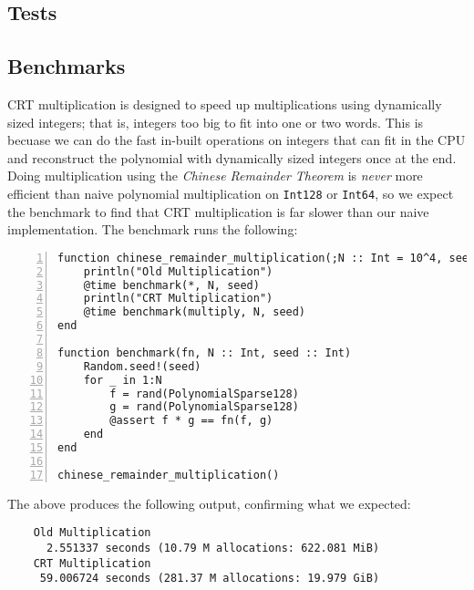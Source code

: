 \documentclass{article}
\theoremstyle{plain}
\numberwithin{theorem}{section}
\numberwithin{example}{section}
\theoremstyle{definition}
\numberwithin{definition}{section}
\begin{document}
\bigbreak

\subsection{Tests}

\bigbreak

\subsection{Benchmarks}
CRT multiplication is designed to speed up multiplications using dynamically
sized integers; that is, integers too big to fit into one or two words. This is
becuase we can do the fast in-built operations on integers that can fit in the
CPU and reconstruct the polynomial with dynamically sized integers once at the
end. Doing multiplication using the \emph{Chinese Remainder Theorem} is
\emph{never} more efficient than naive polynomial multiplication on
\texttt{Int128} or \texttt{Int64}, so we expect the benchmark to find that CRT
multiplication is far slower than our naive implementation. The benchmark runs
the following:

\begin{codebox}
    \begin{Verbatim}[numbers=left,xleftmargin=5mm]
function chinese_remainder_multiplication(;N :: Int = 10^4, seed :: Int = 0)
    println("Old Multiplication")
    @time benchmark(*, N, seed)
    println("CRT Multiplication")
    @time benchmark(multiply, N, seed)
end

function benchmark(fn, N :: Int, seed :: Int)
    Random.seed!(seed)
    for _ in 1:N
        f = rand(PolynomialSparse128)
        g = rand(PolynomialSparse128)
        @assert f * g == fn(f, g)
    end
end

chinese_remainder_multiplication()
    \end{Verbatim}
\end{codebox}

The above produces the following output, confirming what we expected:

\begin{Verbatim}
    Old Multiplication
      2.551337 seconds (10.79 M allocations: 622.081 MiB)
    CRT Multiplication
     59.006724 seconds (281.37 M allocations: 19.979 GiB)
\end{Verbatim}
\end{document}
